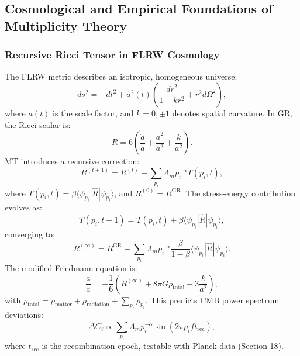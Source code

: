 \documentclass{article}
\theoremstyle{plain}
\begin{document}
\subsection{Cosmological and Empirical Foundations of Multiplicity Theory}

\subsubsection{Recursive Ricci Tensor in FLRW Cosmology}
The FLRW metric describes an isotropic, homogeneous universe:
\begin{equation}
ds^2 = -dt^2 + a^2(t) \left( \frac{dr^2}{1 - k r^2} + r^2 d\Omega^2 \right),
\end{equation}
where \( a(t) \) is the scale factor, and \( k = 0, \pm 1 \) denotes spatial curvature. In GR, the Ricci scalar is:
\begin{equation}
R = 6 \left( \frac{\ddot{a}}{a} + \frac{\dot{a}^2}{a^2} + \frac{k}{a^2} \right).
\end{equation}
MT introduces a recursive correction:
\begin{equation}
R^{(t+1)} = R^{(t)} + \sum_{p_i} \Lambda_m p_i^{-\alpha} T(p_i, t),
\end{equation}
where \( T(p_i, t) = \beta \langle \psi_{p_i} | \hat{R} | \psi_{p_i} \rangle \), and \( R^{(0)} = R^{\text{GR}} \). The stress-energy contribution evolves as:
\begin{equation}
T(p_i, t+1) = T(p_i, t) + \beta \langle \psi_{p_i} | \hat{R} | \psi_{p_i} \rangle,
\end{equation}
converging to:
\begin{equation}
R^{(\infty)} = R^{\text{GR}} + \sum_{p_i} \Lambda_m p_i^{-\alpha} \frac{\beta}{1 - \beta} \langle \psi_{p_i} | \hat{R} | \psi_{p_i} \rangle.
\end{equation}
The modified Friedmann equation is:
\begin{equation}
\frac{\ddot{a}}{a} = -\frac{1}{6} \left( R^{(\infty)} + 8 \pi G \rho_{\text{total}} - 3 \frac{k}{a^2} \right),
\end{equation}
with \( \rho_{\text{total}} = \rho_{\text{matter}} + \rho_{\text{radiation}} + \sum_{p_i} \rho_{p_i} \). This predicts CMB power spectrum deviations:
\begin{equation}
\Delta C_\ell \propto \sum_{p_i} \Lambda_m p_i^{-\alpha} \sin(2 \pi p_i f t_{\text{rec}}),
\end{equation}
where \( t_{\text{rec}} \) is the recombination epoch, testable with Planck data (Section 18).
\end{document}

